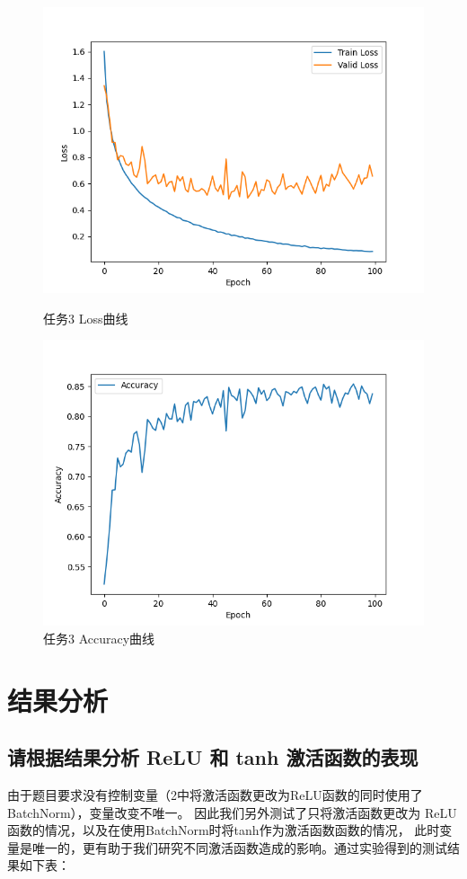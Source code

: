 \documentclass{article}%
\begin{document}
\begin{figure}
    \centering
    \begin{minipage}{0.49\linewidth}
        \centering
        \includegraphics[width=0.9\linewidth]{Loss_6.png}
        \caption{任务3 Loss曲线}
    \end{minipage}
    \begin{minipage}{0.49\linewidth}
        \centering
        \includegraphics[width=0.9\linewidth]{Acc_6.png}
        \caption{任务3 Accuracy曲线}
    \end{minipage}


\end{figure}

\section{结果分析}
\subsection{请根据结果分析 ReLU 和 tanh 激活函数的表现}
由于题目要求没有控制变量（2中将激活函数更改为ReLU函数的同时使用了BatchNorm），变量改变不唯一。
因此我们另外测试了只将激活函数更改为 ReLU 函数的情况，以及在使用BatchNorm时将tanh作为激活函数函数的情况，
此时变量是唯一的，更有助于我们研究不同激活函数造成的影响。通过实验得到的测试结果如下表：
\end{document}
